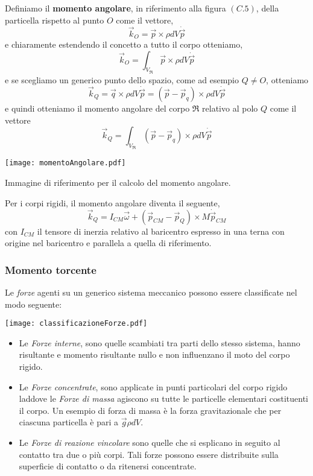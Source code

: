 Definiamo il \textbf{momento angolare}, in riferimento alla figura $(C.5)$, della particella rispetto al punto $O$ come il vettore,
\begin{equation}
	\vec{k}_O = \vec{p} \times \rho dV \dot{\vec{p}}
\end{equation}
e chiaramente estendendo il concetto a tutto il corpo otteniamo, 
\begin{equation}
	\vec{k}_O = \int_{V_{\mathfrak{R}}} \vec{p} \times \rho dV \dot{\vec{p}}
\end{equation}
e se scegliamo un generico punto dello spazio, come ad esempio $Q \neq O$, otteniamo
\begin{equation}
	\vec{k}_Q = \vec{q} \times \rho dV \dot{\vec{p}} = (\vec{p} - \vec{p}_q) \times \rho dV \dot{\vec{p}} 
\end{equation}
e quindi otteniamo il momento angolare del corpo $\mathfrak{R}$ relativo al polo $Q$ come il vettore
\begin{equation}
	\vec{k}_Q = \int_{V_{\mathfrak{R}}} (\vec{p} - \vec{p}_q) \times \rho dV \dot{\vec{p}}
\end{equation}
\begin{center}
	\texttt{[image: momentoAngolare.pdf]}
	\caption{Immagine di riferimento per il calcolo del momento angolare.}
\end{center}

Per i corpi rigidi, il momento angolare diventa il seguente,
\begin{equation}
	\vec{k}_Q = I_{CM} \vec{\omega} + (\vec{p}_{CM} - \vec{p}_Q) \times M \dot{\vec{p}}_{CM}
\end{equation}
con $I_{CM}$ il tensore di inerzia relativo al baricentro espresso in una terna con origine nel baricentro e parallela a quella di riferimento.

\subsubsection{Momento torcente}
Le \emph{forze} agenti su un generico sistema meccanico possono essere classificate nel modo seguente:
\begin{center}
	\texttt{[image: classificazioneForze.pdf]}
\end{center}
\begin{itemize}
	\item Le \emph{Forze interne}, sono quelle scambiati tra parti dello stesso sistema, hanno risultante e momento risultante nullo e non influenzano il moto del corpo rigido.
	\item Le \emph{Forze concentrate}, sono applicate in punti particolari del corpo rigido laddove le \emph{Forze di massa} agiscono su tutte le particelle elementari costituenti il corpo. Un esempio di forza di massa è la forza gravitazionale che per ciascuna particella è pari a $\vec{g} \rho dV$.
	\item Le \emph{Forze di reazione vincolare} sono quelle che si esplicano in seguito al contatto tra due o più corpi. Tali forze possono essere distribuite sulla superficie di contatto o da ritenersi concentrate.
\end{itemize}
